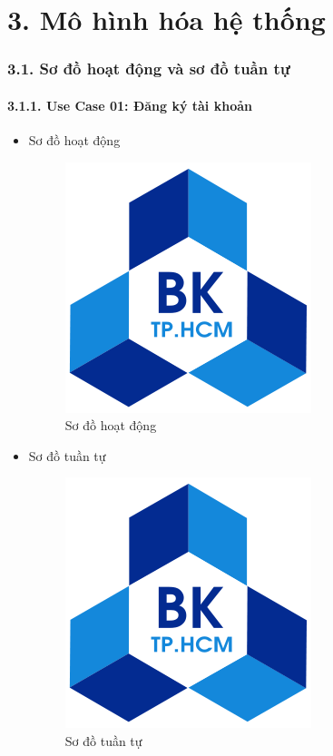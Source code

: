 \part*{3. Mô hình hóa hệ thống}

\section*{3.1. Sơ đồ hoạt động và sơ đồ tuần tự}
\subsection*{3.1.1. Use Case 01: Đăng ký tài khoản}
\begin{itemize}
    \item Sơ đồ hoạt động
    \begin{figure}[H]
    \centering
    \includegraphics[scale=0.5 ]{Picture/hcmut.png}
    \caption{Sơ đồ hoạt động }
    \end{figure}
    \item Sơ đồ tuần tự
    \begin{figure}[H]
    \centering
    \includegraphics[scale=0.5 ]{Picture/hcmut.png}
    \caption{Sơ đồ tuần tự }
    \end{figure}
\end{itemize}
